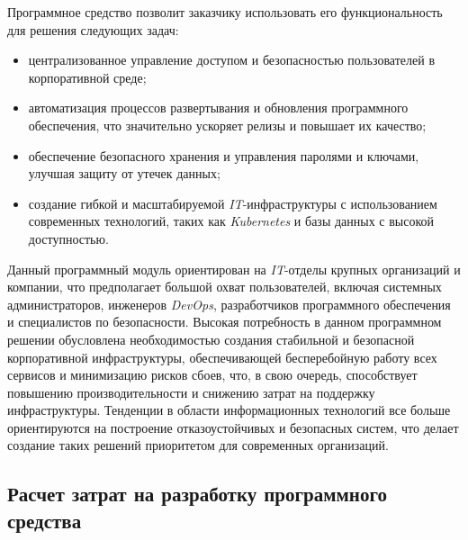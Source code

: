 Программное средство позволит заказчику использовать его функциональность для решения следующих задач:
\begin{itemize}
    \item централизованное управление доступом и безопасностью пользователей в корпоративной среде;
    \item автоматизация процессов развертывания и обновления программного обеспечения, что значительно ускоряет релизы и повышает их качество;
    \item обеспечение безопасного хранения и управления паролями и ключами, улучшая защиту от утечек данных;
    \item создание гибкой и масштабируемой \textit{IT}-инфраструктуры с использованием современных технологий, таких как \textit{Kubernetes} и базы данных с высокой доступностью.
\end{itemize}

Данный программный модуль ориентирован на \textit{IT}-отделы крупных организаций и компании, что предполагает большой охват пользователей, включая системных администраторов, инженеров \textit{DevOps}, разработчиков программного обеспечения и специалистов по безопасности. Высокая потребность в данном программном решении обусловлена необходимостью создания стабильной и безопасной корпоративной инфраструктуры, обеспечивающей бесперебойную работу всех сервисов и минимизацию рисков сбоев, что, в свою очередь, способствует повышению производительности и снижению затрат на поддержку инфраструктуры. Тенденции в области информационных технологий все больше ориентируются на построение отказоустойчивых и безопасных систем, что делает создание таких решений приоритетом для современных организаций.


\subsection{Расчет затрат на разработку программного средства}
\newcommand{\sreengineer}{Инженер доступности}
\newcommand{\programmer}{Инженер-программист}
\newcommand{\businessanalytic}{Бизнес-аналитик}

